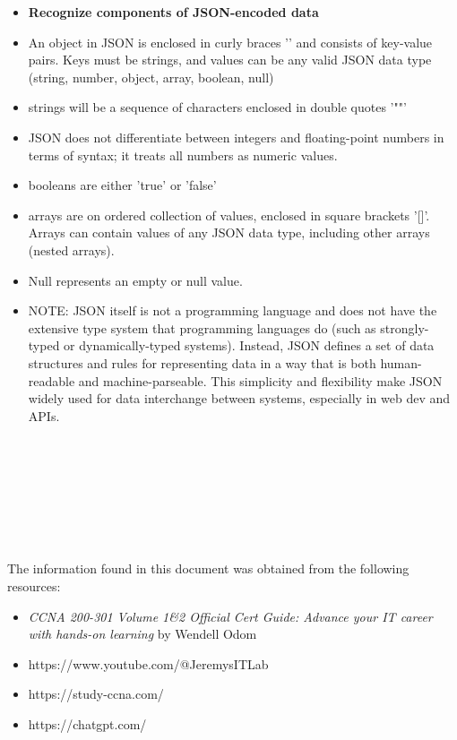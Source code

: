\documentclass{article}
\begin{document}
\begin{itemize}
  \item \textbf{Recognize components of JSON-encoded data}
  	\item[] An object in JSON is enclosed in curly braces '{}' and consists of key-value pairs. Keys must be strings, and values can be any valid JSON data type (string, number, object, array, boolean, null)
  	\item[] strings will be a sequence of characters enclosed in double quotes '""'
  	\item[] JSON does not differentiate between integers and floating-point numbers in terms of syntax; it treats all numbers as numeric values.
	\item[] booleans are either 'true' or 'false' 	
	\item[] arrays are on ordered collection of values, enclosed in square brackets '[]'. Arrays can contain values of any JSON data type, including other arrays (nested arrays).
	\item[] Null represents an empty or null value.
	\item[] NOTE: JSON itself is not a programming language and does not have the extensive type system that programming languages do (such as strongly-typed or dynamically-typed systems). Instead, JSON defines a set of data structures and rules for representing data in a way that is both human-readable and machine-parseable. This simplicity and flexibility make JSON widely used for data interchange between systems, especially in web dev and APIs.\\\\\\\\\\\\\\\\
\end{itemize}

The information found in this document was obtained from the following resources:
\begin{itemize}
\item\textit{CCNA 200-301 Volume 1\&2 Official Cert Guide: Advance your IT career with hands-on learning} by Wendell Odom
\item https://www.youtube.com/@JeremysITLab
\item https://study-ccna.com/
\item https://chatgpt.com/\\
\end{itemize}
\end{document}
